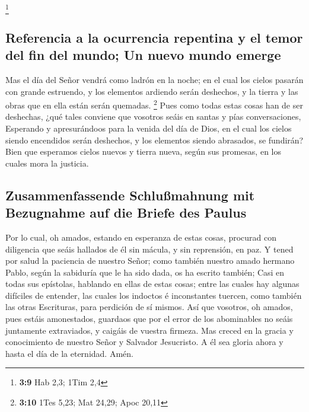 \footnote{\textbf{3:9} Hab 2,3; 1Tim 2,4}

\hypertarget{referencia-a-la-ocurrencia-repentina-y-el-temor-del-fin-del-mundo-un-nuevo-mundo-emerge}{%
\subsection{Referencia a la ocurrencia repentina y el temor del fin del
mundo; Un nuevo mundo
emerge}\label{referencia-a-la-ocurrencia-repentina-y-el-temor-del-fin-del-mundo-un-nuevo-mundo-emerge}}

 Mas el día del Señor vendrá como ladrón en la noche; en
el cual los cielos pasarán con grande estruendo, y los elementos
ardiendo serán deshechos, y la tierra y las obras que en ella están
serán quemadas. \footnote{\textbf{3:10} 1Tes 5,23; Mat 24,29; Apoc 20,11}
 Pues como todas estas cosas han de ser deshechas, ¿qué
tales conviene que vosotros seáis en santas y pías conversaciones,
 Esperando y apresurándoos para la venida del día de
Dios, en el cual los cielos siendo encendidos serán deshechos, y los
elementos siendo abrasados, se fundirán?  Bien que
esperamos cielos nuevos y tierra nueva, según sus promesas, en los
cuales mora la justicia.

\hypertarget{zusammenfassende-schluuxdfmahnung-mit-bezugnahme-auf-die-briefe-des-paulus}{%
\subsection{Zusammenfassende Schlußmahnung mit Bezugnahme auf die Briefe
des
Paulus}\label{zusammenfassende-schluuxdfmahnung-mit-bezugnahme-auf-die-briefe-des-paulus}}

 Por lo cual, oh amados, estando en esperanza de estas
cosas, procurad con diligencia que seáis hallados de él sin mácula, y
sin reprensión, en paz.  Y tened por salud la paciencia
de nuestro Señor; como también nuestro amado hermano Pablo, según la
sabiduría que le ha sido dada, os ha escrito también; 
Casi en todas sus epístolas, hablando en ellas de estas cosas; entre las
cuales hay algunas difíciles de entender, las cuales los indoctos é
inconstantes tuercen, como también las otras Escrituras, para perdición
de sí mismos.  Así que vosotros, oh amados, pues estáis
amonestados, guardaos que por el error de los abominables no seáis
juntamente extraviados, y caigáis de vuestra firmeza. 
Mas creced en la gracia y conocimiento de nuestro Señor y Salvador
Jesucristo. A él sea gloria ahora y hasta el día de la eternidad. Amén.
